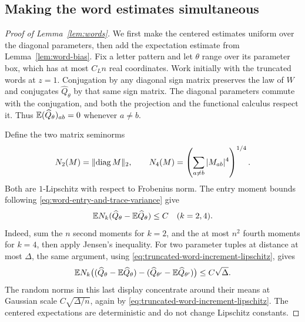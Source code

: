 \subsection{Making the word estimates simultaneous}

\begin{proof}[Proof of Lemma~\ref{lem:words}]
We first make the centered estimates uniform over the diagonal
parameters, then add the expectation estimate from
Lemma~\ref{lem:word-bias}.  Fix a letter pattern and let $\theta$
range over its parameter box, which has at most $C_Ln$ real
coordinates.  Work initially with the truncated words at $z=1$.  Conjugation by any
diagonal sign matrix preserves the law of $W$ and conjugates
$\widehat Q_\theta$ by that same sign matrix.  The diagonal
parameters commute with the conjugation, and both the projection
and the functional calculus respect it.  Thus
$\mathbb E(\widehat Q_\theta)_{ab}=0$ whenever $a\ne b$.

Define the two matrix seminorms
\[
 N_2(M)=\lVert \operatorname{diag} M\rVert_2,\qquad
 N_4(M)=\left(\sum_{a\ne b}|M_{ab}|^4\right)^{1/4}.
\]
Both are $1$-Lipschitz with respect to Frobenius norm.
The entry moment bounds following
\eqref{eq:word-entry-and-trace-variance} give
\begin{equation}\label{eq:centered-word-norm-expectations}
 \mathbb E N_k(\widehat Q_\theta-\mathbb E\widehat Q_\theta)\le C
 \quad(k=2,4).
\end{equation}
Indeed, sum the $n$ second moments for $k=2$, and the at most
$n^2$ fourth moments for $k=4$, then apply Jensen's inequality.
For two parameter tuples at distance at most $\Delta$, the same
argument, using \eqref{eq:truncated-word-increment-lipschitz}, gives
\[
 \mathbb E N_k\bigl((\widehat Q_\theta-\mathbb E\widehat Q_\theta)
             -(\widehat Q_{\theta'}-\mathbb E\widehat Q_{\theta'})\bigr)
 \le C\sqrt\Delta.
\]
The random norms in this last display concentrate around their
means at Gaussian scale $C\sqrt{\Delta/n}$, again by
\eqref{eq:truncated-word-increment-lipschitz}.  The centered
expectations are deterministic and do not change Lipschitz
constants.


\end{proof}
